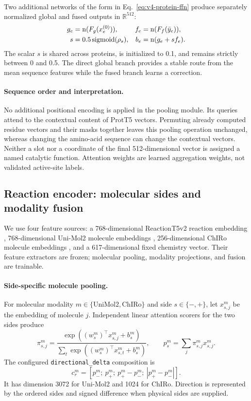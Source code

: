 Two additional networks of the form in Eq.~\eqref{eq:v4-protein-ffn} produce
separately normalized global and fused outputs in $\mathbb{R}^{512}$:
\begin{align}
  g_e &= \operatorname{n}(F_g(x_e^{(0)})), & f_e&=\operatorname{n}(F_f(\bar y_e)),\\
  s&=0.5\operatorname{sigmoid}(\rho_s), & b_e&=\operatorname{n}(g_e+s f_e).
  \label{eq:v4-protein-output}
\end{align}
The scalar $s$ is shared across proteins, is initialized to 0.1, and remains
strictly between 0 and 0.5. The direct global branch provides a stable route
from the mean sequence features while the fused branch learns a correction.

\paragraph{Sequence order and interpretation.}
No additional positional encoding is applied in the pooling module. Its
queries attend to the contextual content of ProtT5 vectors. Permuting already
computed residue vectors and their masks together leaves this pooling operation
unchanged, whereas changing the amino-acid sequence can change the contextual
vectors. Neither a slot nor a coordinate of the final 512-dimensional vector
is assigned a named catalytic function. Attention weights are learned
aggregation weights, not validated active-site labels.

\subsection{Reaction encoder: molecular sides and modality fusion}
\label{sec:v4-reaction}
We use four feature sources: a 768-dimensional ReactionT5v2 reaction embedding
\citep{sagawa2023reactiont5,sagawaReactionT5v2}, 768-dimensional Uni-Mol2
molecule embeddings \citep{ji2024unimol2}, 256-dimensional ChIRo molecule
embeddings \citep{adams2022chiro}, and a 617-dimensional fixed chemistry
vector. Their feature extractors are frozen; molecular pooling, modality
projections, and fusion are trainable.

\paragraph{Side-specific molecule pooling.}
For molecular modality $m\in\{\mathrm{UniMol2},\mathrm{ChIRo}\}$ and side
$s\in\{-,+\}$, let $x_{s,j}^{m}$ be the embedding of molecule $j$.
Independent linear attention scorers for the two sides produce
\begin{equation}
  \pi_{s,j}^{m}=
    \frac{\exp((w_s^m)^\top x_{s,j}^{m}+b_s^m)}
         {\sum_t\exp((w_s^m)^\top x_{s,t}^{m}+b_s^m)},
  \qquad
  p_s^m=\sum_j\pi_{s,j}^{m}x_{s,j}^{m}.
  \label{eq:v4-molecule-pool}
\end{equation}
The configured \texttt{directional\_delta} composition is
\begin{equation}
  c_r^m=[p_-^m;\ p_+^m;\ p_+^m-p_-^m;\ |p_+^m-p_-^m|].
  \label{eq:v4-directional}
\end{equation}
It has dimension 3072 for Uni-Mol2 and 1024 for ChIRo. Direction is represented
by the ordered sides and signed difference when physical sides are supplied.

